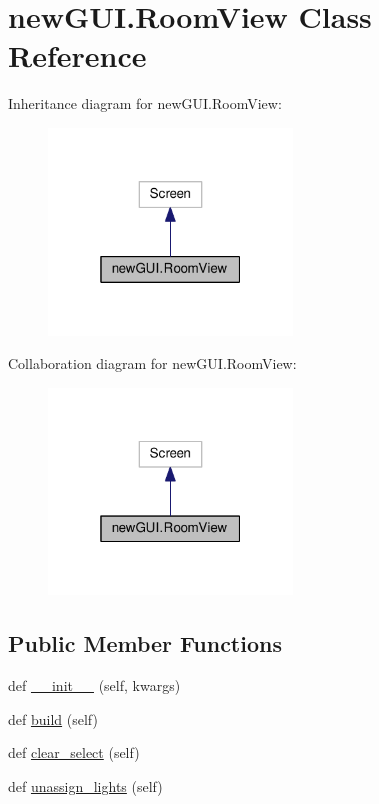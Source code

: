 \hypertarget{classnewGUI_1_1RoomView}{}\section{new\+G\+U\+I.\+Room\+View Class Reference}
\label{classnewGUI_1_1RoomView}


Inheritance diagram for new\+G\+U\+I.\+Room\+View\+:\nopagebreak
\begin{figure}[H]
\begin{center}
\leavevmode
\includegraphics[width=184pt]{classnewGUI_1_1RoomView__inherit__graph}
\end{center}
\end{figure}


Collaboration diagram for new\+G\+U\+I.\+Room\+View\+:\nopagebreak
\begin{figure}[H]
\begin{center}
\leavevmode
\includegraphics[width=184pt]{classnewGUI_1_1RoomView__coll__graph}
\end{center}
\end{figure}
\subsection*{Public Member Functions}
\begin{DoxyCompactItemize}
\item 
def \hyperlink{classnewGUI_1_1RoomView_a6cd60b59cd9fb175ef78b2b54f1477aa}{\+\_\+\+\_\+init\+\_\+\+\_\+} (self, kwargs)
\item 
def \hyperlink{classnewGUI_1_1RoomView_a3ee7de067f3b07acf49aa981c9e24fec}{build} (self)
\item 
def \hyperlink{classnewGUI_1_1RoomView_a895aa2e014ce3d9459866012932f33b7}{clear\+\_\+select} (self)
\item 
def \hyperlink{classnewGUI_1_1RoomView_a2d470249b6ad5bd45e235896ed983f12}{unassign\+\_\+lights} (self)
\end{DoxyCompactItemize}
